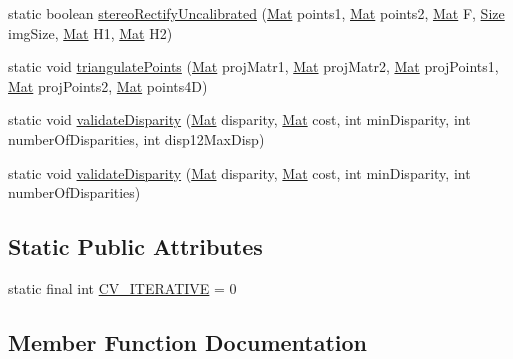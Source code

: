 \begin{DoxyCompactItemize}
\item 
static boolean \mbox{\hyperlink{classorg_1_1opencv_1_1calib3d_1_1_calib3d_a0ddeeb9de8f3bd4e8dac6b7b4c531e8e}{stereo\+Rectify\+Uncalibrated}} (\mbox{\hyperlink{classorg_1_1opencv_1_1core_1_1_mat}{Mat}} points1, \mbox{\hyperlink{classorg_1_1opencv_1_1core_1_1_mat}{Mat}} points2, \mbox{\hyperlink{classorg_1_1opencv_1_1core_1_1_mat}{Mat}} F, \mbox{\hyperlink{classorg_1_1opencv_1_1core_1_1_size}{Size}} img\+Size, \mbox{\hyperlink{classorg_1_1opencv_1_1core_1_1_mat}{Mat}} H1, \mbox{\hyperlink{classorg_1_1opencv_1_1core_1_1_mat}{Mat}} H2)
\item 
static void \mbox{\hyperlink{classorg_1_1opencv_1_1calib3d_1_1_calib3d_a3da703062fa27931cd6e22d1a7493961}{triangulate\+Points}} (\mbox{\hyperlink{classorg_1_1opencv_1_1core_1_1_mat}{Mat}} proj\+Matr1, \mbox{\hyperlink{classorg_1_1opencv_1_1core_1_1_mat}{Mat}} proj\+Matr2, \mbox{\hyperlink{classorg_1_1opencv_1_1core_1_1_mat}{Mat}} proj\+Points1, \mbox{\hyperlink{classorg_1_1opencv_1_1core_1_1_mat}{Mat}} proj\+Points2, \mbox{\hyperlink{classorg_1_1opencv_1_1core_1_1_mat}{Mat}} points4D)
\item 
static void \mbox{\hyperlink{classorg_1_1opencv_1_1calib3d_1_1_calib3d_a5602a849111be88c91348e13795ba888}{validate\+Disparity}} (\mbox{\hyperlink{classorg_1_1opencv_1_1core_1_1_mat}{Mat}} disparity, \mbox{\hyperlink{classorg_1_1opencv_1_1core_1_1_mat}{Mat}} cost, int min\+Disparity, int number\+Of\+Disparities, int disp12\+Max\+Disp)
\item 
static void \mbox{\hyperlink{classorg_1_1opencv_1_1calib3d_1_1_calib3d_aadd44bca728908e8afff768d760e3a83}{validate\+Disparity}} (\mbox{\hyperlink{classorg_1_1opencv_1_1core_1_1_mat}{Mat}} disparity, \mbox{\hyperlink{classorg_1_1opencv_1_1core_1_1_mat}{Mat}} cost, int min\+Disparity, int number\+Of\+Disparities)
\end{DoxyCompactItemize}
\subsection*{Static Public Attributes}
\begin{DoxyCompactItemize}
\item 
static final int \mbox{\hyperlink{classorg_1_1opencv_1_1calib3d_1_1_calib3d_a3f736627ca0cf3d33c043fc10a937081}{C\+V\+\_\+\+I\+T\+E\+R\+A\+T\+I\+VE}} = 0
\end{DoxyCompactItemize}


\subsection{Member Function Documentation}
\mbox{\label{classorg_1_1opencv_1_1calib3d_1_1_calib3d_abb2da586f9e7234fede7598a15426bfa}} 
